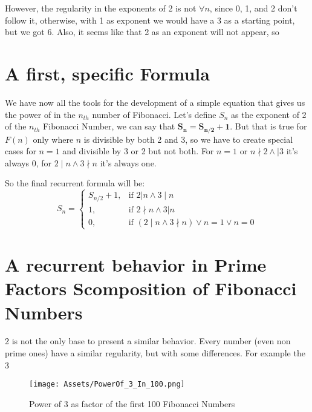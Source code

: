 \documentclass[amsmath,amssymb,aps,pra,reprint,groupedaddress,showpacs]{revtex4-1}
\begin{document}
However, the regularity in the exponents of 2 is not $\forall n$, since 0, 1, and 2 don't follow it,
otherwise, with 1 as exponent we would have a 3 as a starting point, but we got 6. Also, it seems like that 2 as an exponent will not appear,
so 

\section{A first, specific Formula}

We have now all the tools for the development of a simple equation that gives us the power of in the $n_{th}$ number of Fibonacci. Let's define $S_n$ as the exponent of 2 of the $n_{th}$ Fibonacci Number, 
we can say that $\mathbf{S_n = S_{n/2} + 1}$. But that is true for $F(n)$ only where $n$ is divisible by both 2 and 3, so we have to create special cases for
$n=1$ and divisible by 3 or 2 but not both. For $n = 1$ or $n \nmid 2 \land \mid 3 $ it's always 0, for $2 \mid n \land 3 \nmid n $ it's always one.

So the final recurrent formula will be: 
$$S_n = \begin{cases} S_{n/2} + 1, & \mbox{if }2|n \land 3 \mid n \\ 1, & \mbox{if } 2 \nmid n \land 3|n \\ 0, & \mbox{if } \left( 2 \mid n \land 3 \nmid n \right) \lor n = 1 \lor n = 0
\end{cases} $$


\section{A recurrent behavior in Prime Factors Scomposition of Fibonacci Numbers}

2 is not the only base to present a similar behavior. Every number (even non prime ones) have a similar regularity, but with some differences.
For example the 3

\begin{figure}[H]
\centering
\texttt{[image: Assets/PowerOf\_3\_In\_100.png]} %
\caption{Power of 3 as factor of the first 100 Fibonacci Numbers}
\end{figure}
\end{document}
